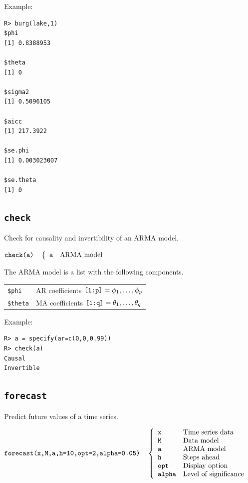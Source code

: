 \documentclass[12pt]{article}
\begin{document}
\noindent
Example:
\begin{verbatim}
R> burg(lake,1)
$phi
[1] 0.8388953

$theta
[1] 0

$sigma2
[1] 0.5096105

$aicc
[1] 217.3922

$se.phi
[1] 0.003023007

$se.theta
[1] 0
\end{verbatim}

\newpage

\subsection{\tt check}
Check for causality and invertibility of an ARMA model.

\bigskip
$
\hbox{\tt check(a)}\quad\left\{\begin{array}{ll}
{\tt a} & \hbox{ARMA model}\\
\end{array}\right.
$

\bigskip
\noindent
The ARMA model is a list with the following components.

\begin{center}
\begin{tabular}{ll}
{\tt \$phi} & AR coefficients $\hbox{\tt[1:p]}=\phi_1,\ldots,\phi_p$\\
{\tt \$theta} & MA coefficients $\hbox{\tt[1:q]}=\theta_1,\ldots,\theta_q$
\end{tabular}
\end{center}

\noindent
Example:
\begin{verbatim}
R> a = specify(ar=c(0,0,0.99))
R> check(a)
Causal
Invertible
\end{verbatim}

\newpage

\subsection{\tt forecast}
Predict future values of a time series.

\bigskip
$
\hbox{\tt forecast(x,M,a,h=10,opt=2,alpha=0.05)}\quad\left\{\begin{array}{ll}
{\tt x} & \hbox{Time series data}\\
{\tt M} & \hbox{Data model}\\
{\tt a} & \hbox{ARMA model}\\
{\tt h} & \hbox{Steps ahead}\\
{\tt opt} & \hbox{Display option}\\
{\tt alpha} & \hbox{Level of significance}
\end{array}\right.
$
\end{document}

